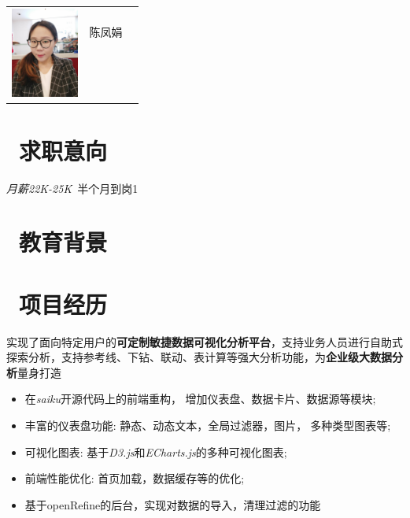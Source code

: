 \documentclass{resume}
\begin{document}

\Large{
  \begin{tabu}{ c l r }
    & \scshape{陈凤娟} & \\%
    &  &  \\
    &  &  \\
    &  &  \\
    &  & 
  \end{tabu}
}

\normalsize
\section{\faInfo\  求职意向}
\textit{月薪22K-25K}\ 半个月到岗1

\section{\faGraduationCap\  教育背景}

\section{\faUsers\ 项目经历}
\begin{onehalfspacing}
实现了面向特定用户的\textbf{可定制敏捷数据可视化分析平台}，支持业务人员进行自助式探索分析，支持参考线、下钻、联动、表计算等强大分析功能，为\textbf{企业级大数据分析}量身打造
\begin{itemize}
\item 在\textit{saiku}开源代码上的前端重构， 增加仪表盘、数据卡片、数据源等模块;
\item 丰富的仪表盘功能: 静态、动态文本，全局过滤器，图片，多种类型图表等;
\item 可视化图表: 基于\textit{D3.js}和\textit{ECharts.js}的多种可视化图表;
\item 前端性能优化: 首页加载，数据缓存等的优化;
\item 基于openRefine的后台，实现对数据的导入，清理过滤的功能
\end{itemize}
\end{onehalfspacing}
\end{document}
